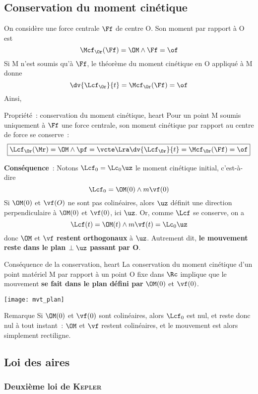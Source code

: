 \documentclass[../main/main.tex]{subfiles}
\begin{document}
\subsection{Conservation du moment cinétique}
On considère une force centrale $\Ff$ de centre O. Son moment par rapport à O
est
\[\Mcf_\Or(\Ff) = \OM\wedge\Ff = \of\]
Si M n'est soumis qu'à $\Ff$, le théorème du moment cinétique en O appliqué à M
donne
\[\dv{\Lcf_\Or}{t} = \Mcf_\Or(\Ff) = \of\]
Ainsi,
\begin{tprop}{Propriété~: conservation du moment cinétique, heart}
    Pour un point M soumis uniquement à $\Ff$ une force centrale, son moment
    cinétique par rapport au centre de force se conserve~:
    \[
        \boxed{
            \Lcf_\Or(\Mr) = \OM\wedge\pf = \vcte
            \Lra
            \dv{\Lcf_\Or}{t} = \Mcf_\Or(\Ff) = \of
        }
    \]
\end{tprop}
\textbf{Conséquence}~: Notons $\Lcf_0 = \Lc_0\uz$ le moment cinétique
initial, c'est-à-dire
\[\Lcf_0 = \OM(0)\wedge m\vf(0)\]
Si $\OM(0)$ et $\vf(O)$ ne sont pas colinéaires, alors $\uz$ définit une
direction perpendiculaire à $\OM(0)$ et $\vf(0)$, ici $\uz$. Or, comme $\Lcf$ se
conserve, on a
\[\Lcf(t) = \OM(t)\wedge m\vf(t) = \Lc_0\uz\]
donc $\OM$ et $\vf$ \textbf{restent orthogonaux} à $\uz$. Autrement dit,
\textbf{le mouvement reste dans le plan $\perp \uz$ passant par O}.
\begin{tcoro}{Conséquence de la conservation, heart}
    La conservation du moment cinétique d'un point matériel M par rapport à un
    point O fixe dans $\Rc$ implique que le mouvement \textbf{se fait dans le
    plan défini par} $\OM(0)$ et $\vf(0)$.
    \begin{center}
        \texttt{[image: mvt\_plan]}
    \end{center}
\end{tcoro}

\begin{rrema}{Remarque}
    Si $\OM(0)$ et $\vf(0)$ sont colinéaires, alors $\Lcf_0$ est nul, et reste
    donc nul à tout instant~: $\OM$ et $\vf$ restent colinéaires, et le
    mouvement est alors simplement rectiligne.
\end{rrema}

\subsection{Loi des aires}
\subsubsection{Deuxième loi de \textsc{Kepler}}
\end{document}
